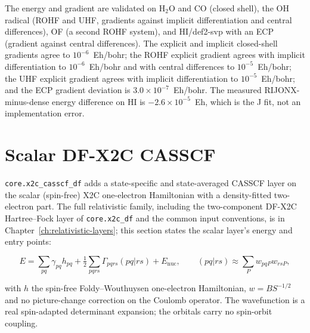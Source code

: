 The energy and gradient are validated on H$_2$O and CO (closed shell),
the OH radical (ROHF and UHF, gradients against implicit
differentiation and central differences), OF (a second ROHF system),
and HI/def2-svp with an ECP (gradient against central differences).
The explicit and implicit closed-shell gradients agree to
$10^{-6}$~Eh/bohr; the ROHF explicit gradient agrees with implicit
differentiation to $10^{-6}$~Eh/bohr and with central differences to
$10^{-5}$~Eh/bohr; the UHF explicit gradient agrees with implicit
differentiation to $10^{-5}$~Eh/bohr; and the ECP gradient deviation is
$3.0\times10^{-7}$~Eh/bohr.  The measured RIJONX-minus-dense energy
difference on HI is $-2.6\times10^{-5}$~Eh, which is the J fit, not an
implementation error.

\section{Scalar DF-X2C CASSCF}
\label{sec:new-x2c-casscf}

\texttt{core.x2c\_casscf\_df} adds a state-specific and state-averaged
CASSCF layer on the scalar (spin-free) X2C one-electron Hamiltonian
with a density-fitted two-electron part.  The full relativistic family,
including the two-component DF-X2C Hartree--Fock layer of
\texttt{core.x2c\_df} and the common input conventions, is in
Chapter~\ref{ch:relativistic-layers}; this section states the scalar
layer's energy and entry points:

\begin{equation}
  E = \sum_{pq}\gamma_{pq} h_{pq}
    + \tfrac{1}{2}\sum_{pqrs}\Gamma_{pqrs}(pq|rs) + E_{\mathrm{nuc}},
  \qquad
  (pq|rs) \approx \sum_{P} w_{pqP} w_{rsP},
  \label{eq:new-x2c}
\end{equation}

with $h$ the spin-free Foldy--Wouthuysen one-electron Hamiltonian,
$w = B S^{-1/2}$ and no picture-change correction on the Coulomb
operator.  The wavefunction is a real spin-adapted determinant
expansion; the orbitals carry no spin-orbit coupling.

